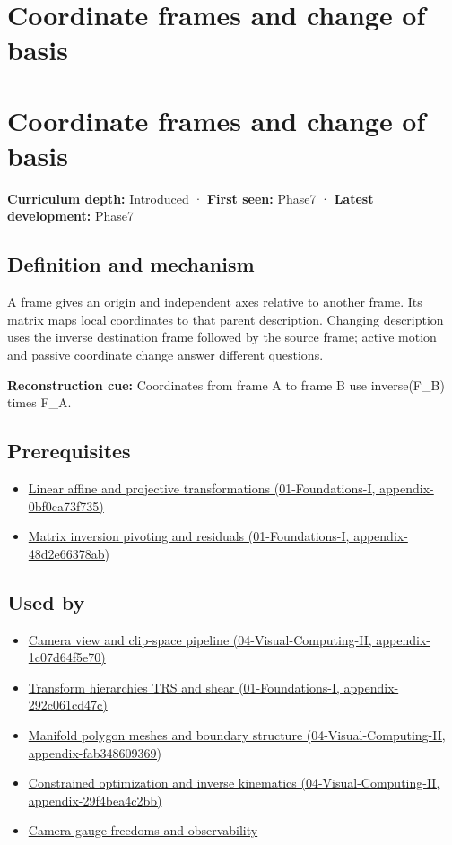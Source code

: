 \hypertarget{appendix-1bae9457dbc3}{}
\section*{Coordinate frames and change of basis}
\section{Coordinate frames and change of basis}\label{coordinate-frames-and-change-of-basis}

\textbf{Curriculum depth:} Introduced · \textbf{First seen:} Phase7 · \textbf{Latest development:} Phase7

\subsection{Definition and mechanism}\label{definition-and-mechanism}

A frame gives an origin and independent axes relative to another frame. Its matrix maps local coordinates to that parent description. Changing description uses the inverse destination frame followed by the source frame; active motion and passive coordinate change answer different questions.

\textbf{Reconstruction cue:} Coordinates from frame A to frame B use inverse(F\_B) times F\_A.

\subsection{Prerequisites}\label{prerequisites}

\begin{itemize}
\tightlist
\item
  \href{}{Linear affine and projective transformations (01-Foundations-I, appendix-0bf0ca73f735)}
\item
  \href{}{Matrix inversion pivoting and residuals (01-Foundations-I, appendix-48d2e66378ab)}
\end{itemize}

\subsection{Used by}\label{used-by}

\begin{itemize}
\item
  \href{}{Camera view and clip-space pipeline (04-Visual-Computing-II, appendix-1c07d64f5e70)}
\item
  \href{}{Transform hierarchies TRS and shear (01-Foundations-I, appendix-292c061cd47c)}
\item
  \href{}{Manifold polygon meshes and boundary structure (04-Visual-Computing-II, appendix-fab348609369)}
\item
  \href{}{Constrained optimization and inverse kinematics (04-Visual-Computing-II, appendix-29f4bea4c2bb)}
\item
  \hyperref[appendix-113f0267e5f4]{Camera gauge freedoms and observability}
\end{itemize}


